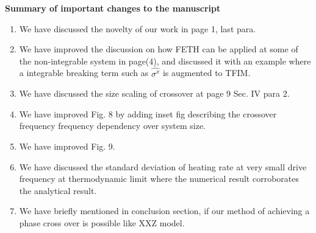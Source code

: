 \documentclass[aps,prb,reprint,showpacs,floatfix,superscriptaddress, onecolumn, nofootinbib, 9pt]{revtex4-2}
\begin{document}
	\vskip 1cm 
	\noindent \textbf{Summary of important changes to the  manuscript}
	
	
	\begin{enumerate}
		\item We have discussed the novelty of our work in page 1, last para.
		\item We have improved the discussion on how FETH can be applied at some of the non-integrable system in page(4), and discussed it with an example where a integrable breaking term such as $\hat{\sigma^x}$ is augmented to TFIM.
		\item We have discussed the size scaling of crossover at page 9 Sec. IV para 2.
		\item We have improved Fig. 8 by adding inset fig describing the crossover frequency frequency dependency over system size.
		\item We have improved Fig. 9.
		\item We have discussed the standard deviation of heating rate at very small drive frequency at thermodynamic limit where the numerical result corroborates the analytical result.
		\item We have briefly mentioned in conclusion section, if our method of achieving a phase cross over is possible like XXZ model. 
	\end{enumerate}
	
	
	
	
\end{document}
